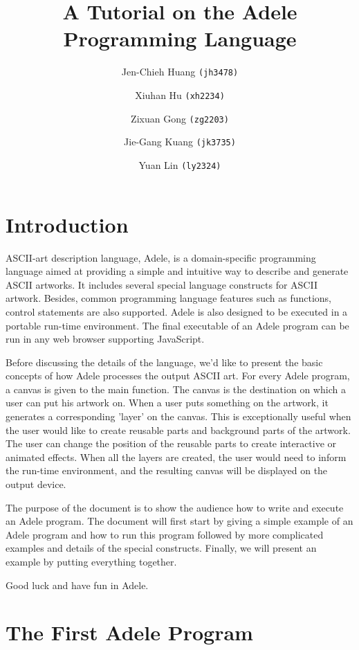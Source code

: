 \documentclass[11pt,letterpaper]{article}
\begin{document}
\title {A Tutorial on the Adele Programming Language}
\author {
	Jen-Chieh Huang \texttt{(jh3478)} \and Xiuhan Hu \texttt{(xh2234)} \and     
	Zixuan Gong \texttt{(zg2203)} \and Jie-Gang Kuang \texttt{(jk3735)} \and 
	Yuan Lin \texttt{(ly2324)}
}
\maketitle

\section {Introduction}

ASCII-art description language, Adele, is a domain-specific programming language aimed at providing a simple and intuitive way to describe and generate ASCII artworks. It includes several special language constructs for ASCII artwork. Besides, common programming language features such as functions, control statements are also supported. Adele is also designed to be executed in a portable run-time environment. The final executable of an Adele program can be run in any web browser supporting JavaScript. 

Before discussing the details of the language, we'd like to present the basic concepts of how Adele processes the output ASCII art. For every Adele program, a canvas is given to the main function. The canvas is the destination on which a user can put his artwork on. When a user puts something on the artwork, it generates a corresponding 'layer' on the canvas. This is exceptionally useful when the user would like to create reusable parts and background parts of the artwork. The user can change the position of the reusable parts to create interactive or animated effects. When all the layers are created, the user would need to inform the run-time environment, and the resulting canvas will be displayed on the output device.

The purpose of the document is to show the audience how to write and execute an Adele program. The document will first start by giving a simple example of an Adele program and how to run this program followed by more complicated examples and details of the special constructs. Finally, we will present an example by putting everything together.

Good luck and have fun in Adele.

\section {The First Adele Program}
\end{document}
